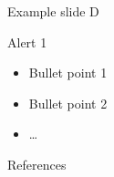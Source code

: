 \documentclass[18pt]{beamer}
\begin{document}
\begin{frame}{Example slide D}
\begin{alertblock}{Alert 1}
\begin{itemize}
\item Bullet point 1
\pause
\item Bullet point 2
\item \dots
\end{itemize}
\end{alertblock}
\end{frame}

\appendix
\beginbackup

\begin{frame}[allowframebreaks]{References}
\printbibliography
\end{frame}

\backupend
\end{document}

